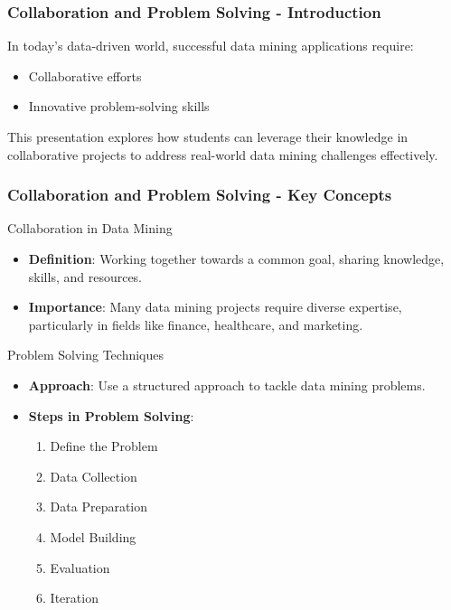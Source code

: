 \documentclass{beamer}
\begin{document}
\begin{frame}[fragile]
    \frametitle{Collaboration and Problem Solving - Introduction}
    In today's data-driven world, successful data mining applications require:
    \begin{itemize}
        \item Collaborative efforts
        \item Innovative problem-solving skills
    \end{itemize}
    This presentation explores how students can leverage their knowledge in collaborative projects to address real-world data mining challenges effectively.
\end{frame}

\begin{frame}[fragile]
    \frametitle{Collaboration and Problem Solving - Key Concepts}
    \begin{block}{Collaboration in Data Mining}
        \begin{itemize}
            \item \textbf{Definition}: Working together towards a common goal, sharing knowledge, skills, and resources.
            \item \textbf{Importance}: Many data mining projects require diverse expertise, particularly in fields like finance, healthcare, and marketing.
        \end{itemize}
    \end{block}

    \begin{block}{Problem Solving Techniques}
        \begin{itemize}
            \item \textbf{Approach}: Use a structured approach to tackle data mining problems.
            \item \textbf{Steps in Problem Solving}:
                \begin{enumerate}
                    \item Define the Problem
                    \item Data Collection
                    \item Data Preparation
                    \item Model Building
                    \item Evaluation
                    \item Iteration
                \end{enumerate}
        \end{itemize}
    \end{block}
\end{frame}
\end{document}

